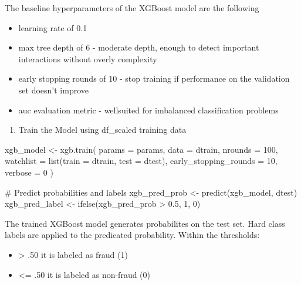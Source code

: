 \documentclass[
  11pt,
  letterpaper,
  DIV=11,
  numbers=noendperiod]{scrartcl}
\newenvironment{Shaded}{}{}
\newcommand{\AttributeTok}[1]{\textcolor[rgb]{0.84,0.23,0.29}{#1}}
\newcommand{\CommentTok}[1]{\textcolor[rgb]{0.42,0.45,0.49}{#1}}
\newcommand{\DecValTok}[1]{\textcolor[rgb]{0.00,0.36,0.77}{#1}}
\newcommand{\FloatTok}[1]{\textcolor[rgb]{0.00,0.36,0.77}{#1}}
\newcommand{\FunctionTok}[1]{\textcolor[rgb]{0.44,0.26,0.76}{#1}}
\newcommand{\NormalTok}[1]{\textcolor[rgb]{0.14,0.16,0.18}{#1}}
\newcommand{\OtherTok}[1]{\textcolor[rgb]{0.44,0.26,0.76}{#1}}
\newcommand{\SpecialCharTok}[1]{\textcolor[rgb]{0.00,0.36,0.77}{#1}}
\providecommand{\tightlist}{%
  \setlength{\itemsep}{0pt}\setlength{\parskip}{0pt}}\usepackage{longtable,booktabs,array}
\begin{document}
The baseline hyperparameters of the XGBoost model are the following

\begin{itemize}
\item
  learning rate of 0.1
\item
  max tree depth of 6 - moderate depth, enough to detect important
  interactions without overly complexity
\item
  early stopping rounds of 10 - stop training if performance on the
  validation set doesn't improve
\item
  auc evaluation metric - wellsuited for imbalanced classification
  problems
\end{itemize}

\begin{enumerate}
\def\labelenumi{\arabic{enumi}.}
\setcounter{enumi}{2}
\tightlist
\item
  Train the Model using df\_scaled training data
\end{enumerate}

\begin{Shaded}
\begin{Highlighting}[]
\NormalTok{xgb\_model }\OtherTok{\textless{}{-}} \FunctionTok{xgb.train}\NormalTok{(}
  \AttributeTok{params =}\NormalTok{ params,}
  \AttributeTok{data =}\NormalTok{ dtrain,}
  \AttributeTok{nrounds =} \DecValTok{100}\NormalTok{,}
  \AttributeTok{watchlist =} \FunctionTok{list}\NormalTok{(}\AttributeTok{train =}\NormalTok{ dtrain, }\AttributeTok{test =}\NormalTok{ dtest),}
  \AttributeTok{early\_stopping\_rounds =} \DecValTok{10}\NormalTok{,}
  \AttributeTok{verbose =} \DecValTok{0}
\NormalTok{)}

\CommentTok{\# Predict probabilities and labels}
\NormalTok{xgb\_pred\_prob }\OtherTok{\textless{}{-}} \FunctionTok{predict}\NormalTok{(xgb\_model, dtest)}
\NormalTok{xgb\_pred\_label }\OtherTok{\textless{}{-}} \FunctionTok{ifelse}\NormalTok{(xgb\_pred\_prob }\SpecialCharTok{\textgreater{}} \FloatTok{0.5}\NormalTok{, }\DecValTok{1}\NormalTok{, }\DecValTok{0}\NormalTok{)}
\end{Highlighting}
\end{Shaded}

The trained XGBoost model generates probabilites on the test set. Hard
class labels are applied to the predicated probability. Within the
thresholds:

\begin{itemize}
\item
  \textgreater{} .50 it is labeled as fraud (1)
\item
  \textless= .50 it is labeled as non-fraud (0)
\end{itemize}
\end{document}

